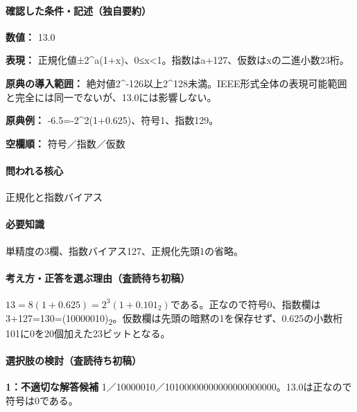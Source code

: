 \paragraph{確認した条件・記述（独自要約）}\mbox{}\par

\noindent\textbf{数値：} 13.0\par

\noindent\textbf{表現：} 正規化値±2\textasciicircum{}a(1+x)、0≤x<1。指数はa+127、仮数はxの二進小数23桁。\par

\noindent\textbf{原典の導入範囲：} 絶対値2\textasciicircum{}-126以上2\textasciicircum{}128未満。IEEE形式全体の表現可能範囲と完全には同一でないが、13.0には影響しない。\par

\noindent\textbf{原典例：} -6.5=-2\textasciicircum{}2(1+0.625)、符号1、指数129。\par

\noindent\textbf{空欄順：} 符号／指数／仮数\par

\paragraph{問われる核心} 正規化と指数バイアス

\paragraph{必要知識} 単精度の3欄、指数バイアス127、正規化先頭1の省略。

\paragraph{考え方・正答を選ぶ理由（査読待ち初稿）} \(13=8(1+0.625)=2^3(1+0.101_2)\)である。正なので符号0、指数欄は3+127=\allowbreak{}130=\allowbreak{}(10000010)\textsubscript{2}。仮数欄は先頭の暗黙の1を保存せず、0.625の小数桁101に0を20個加えた23ビットとなる。

\paragraph{選択肢の検討（査読待ち初稿）}\mbox{}\par

\noindent\textbf{1：不適切な解答候補} 1／10000010／10100000000000000000000。13.0は正なので符号は0である。\par

